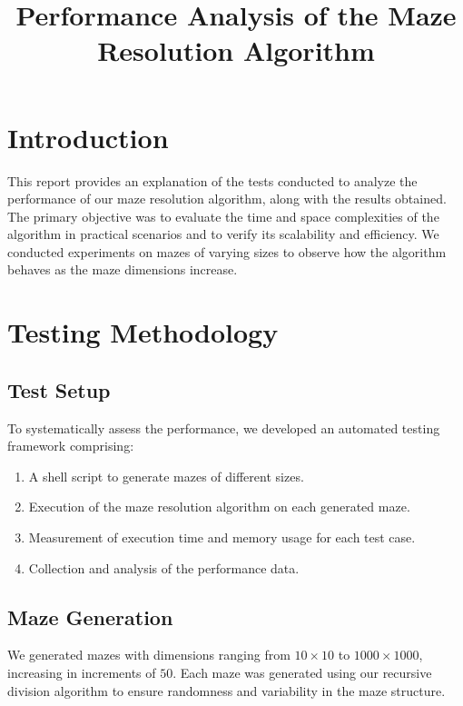 \documentclass{article}
\begin{document}
\title{Performance Analysis of the Maze Resolution Algorithm}
\author{}
\date{}
\maketitle

\section*{Introduction}

This report provides an explanation of the tests conducted to analyze the performance of our maze resolution algorithm, along with the results obtained. The primary objective was to evaluate the time and space complexities of the algorithm in practical scenarios and to verify its scalability and efficiency. We conducted experiments on mazes of varying sizes to observe how the algorithm behaves as the maze dimensions increase.

\section*{Testing Methodology}

\subsection*{Test Setup}

To systematically assess the performance, we developed an automated testing framework comprising:

\begin{enumerate}
    \item A shell script to generate mazes of different sizes.
    \item Execution of the maze resolution algorithm on each generated maze.
    \item Measurement of execution time and memory usage for each test case.
    \item Collection and analysis of the performance data.
\end{enumerate}

\subsection*{Maze Generation}

We generated mazes with dimensions ranging from $10 \times 10$ to $1000 \times 1000$, increasing in increments of $50$. Each maze was generated using our recursive division algorithm to ensure randomness and variability in the maze structure.
\end{document}
